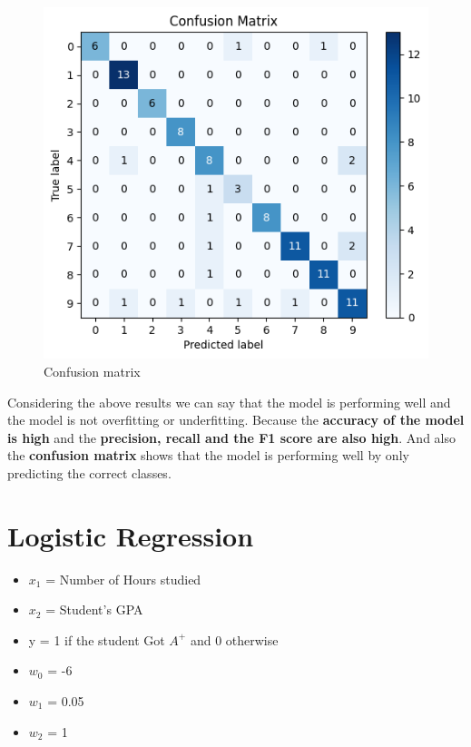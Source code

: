 \documentclass[11pt,a4paper]{article}
\begin{document}
\newpage

\begin{figure}
    \centering
    \includegraphics[width=1.0\linewidth]{images/52.png}
    \caption{Confusion matrix}
\end{figure}

Considering the above results we can say that the model is performing well and the model is not overfitting or underfitting. Because the \textbf{accuracy of the model is high} and the \textbf{precision, recall and the F1 score are also high}. And also the \textbf{confusion matrix} shows that the model is performing well by only predicting the correct classes.

\section{Logistic Regression}

\begin{itemize}
    \item $x_{1}$ = Number of Hours studied
    \item $x_{2}$ = Student's GPA 
    \item y = 1 if the student Got $A^{+}$ and 0 otherwise
    \item $w_{0}$ = -6
    \item $w_{1}$ = 0.05
    \item $w_{2}$ = 1
\end{itemize}
\end{document}
